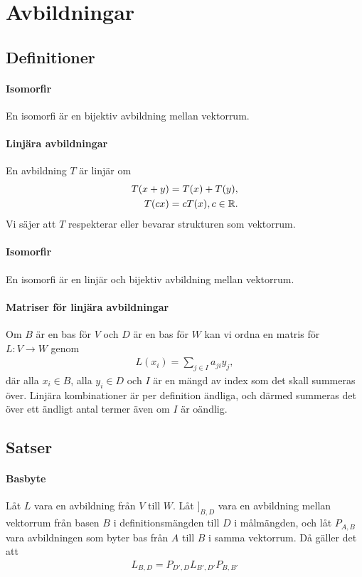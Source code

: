 \section{Avbildningar}

\subsection{Definitioner}

\paragraph{Isomorfir}
En isomorfi är en bijektiv avbildning mellan vektorrum.

\paragraph{Linjära avbildningar}
En avbildning $T$ är linjär om
\begin{align*}
	T(x + y) = T(x) + T(y), \\
	T(cx) = cT(x), c\in\mathbb{R}.
\end{align*}
Vi säjer att $T$ respekterar eller bevarar strukturen som vektorrum.

\paragraph{Isomorfir}
En isomorfi är en linjär och bijektiv avbildning mellan vektorrum.

\paragraph{Matriser för linjära avbildningar}
Om $B$ är en bas för $V$ och $D$ är en bas för $W$ kan vi ordna en matris för $L: V\to W$ genom
\begin{align*}
	L(x_{i}) = \sum\limits_{j\in I}a_{ji}y_{j},
\end{align*}
där alla $x_{i}\in B$, alla $y_{i}\in D$ och $I$ är en mängd av index som det skall summeras över. Linjära kombinationer är per definition ändliga, och därmed summeras det över ett ändligt antal termer även om $I$ är oändlig.

\subsection{Satser}

\paragraph{Basbyte}
Låt $L$ vara en avbildning från $V$ till $W$. Låt $]_{B, D}$ vara en avbildning mellan vektorrum från basen $B$ i definitionsmängden till $D$ i målmängden, och låt $P_{A, B}$ vara avbildningen som byter bas från $A$ till $B$ i samma vektorrum. Då gäller det att
\begin{align*}
	L_{B, D} = P_{D', D}L_{B', D'}P_{B, B'}
\end{align*}


